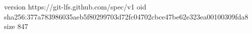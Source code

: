 version https://git-lfs.github.com/spec/v1
oid sha256:377a783986035aeb5f80299703d72fc04702cbce47be62e323ea00100309fda8
size 847
